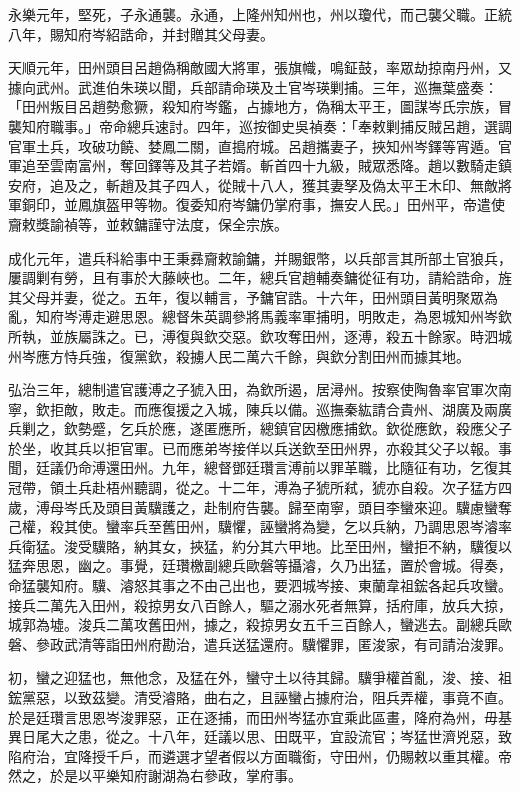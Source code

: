 \begin{pinyinscope}
永樂元年，堅死，子永通襲。永通，上隆州知州也，州以瓊代，而己襲父職。正統八年，賜知府岑紹誥命，并封贈其父母妻。

天順元年，田州頭目呂趙偽稱敵國大將軍，張旗幟，鳴鉦鼓，率眾劫掠南丹州，又據向武州。武進伯朱瑛以聞，兵部請命瑛及土官岑瑛剿捕。三年，巡撫葉盛奏：「田州叛目呂趙勢愈獗，殺知府岑鑑，占據地方，偽稱太平王，圖謀岑氏宗族，冒襲知府職事。」帝命總兵速討。四年，巡按御史吳禎奏：「奉敕剿捕反賊呂趙，選調官軍土兵，攻破功饒、婪鳳二關，直搗府城。呂趙攜妻子，挾知州岑鐸等宵遁。官軍追至雲南富州，奪回鐸等及其子若婿。斬首四十九級，賊眾悉降。趙以數騎走鎮安府，追及之，斬趙及其子四人，從賊十八人，獲其妻孥及偽太平王木印、無敵將軍銅印，並鳳旗盔甲等物。復委知府岑鏞仍掌府事，撫安人民。」田州平，帝遣使齎敕獎諭禎等，並敕鏞謹守法度，保全宗族。

成化元年，遣兵科給事中王秉彞齎敕諭鏞，并賜銀幣，以兵部言其所部土官狼兵，屢調剿有勞，且有事於大藤峽也。二年，總兵官趙輔奏鏞從征有功，請給誥命，旌其父母并妻，從之。五年，復以輔言，予鏞官誥。十六年，田州頭目黃明聚眾為亂，知府岑溥走避思恩。總督朱英調參將馬義率軍捕明，明敗走，為恩城知州岑欽所執，並族屬誅之。已，溥復與欽交惡。欽攻奪田州，逐溥，殺五十餘家。時泗城州岑應方恃兵強，復黨欽，殺擄人民二萬六千餘，與欽分割田州而據其地。

弘治三年，總制遣官護溥之子猇入田，為欽所遏，居潯州。按察使陶魯率官軍次南寧，欽拒敵，敗走。而應復援之入城，陳兵以備。巡撫秦紘請合貴州、湖廣及兩廣兵剿之，欽勢蹙，乞兵於應，遂匿應所，總鎮官因檄應捕欽。欽從應飲，殺應父子於坐，收其兵以拒官軍。已而應弟岑接佯以兵送欽至田州界，亦殺其父子以報。事聞，廷議仍命溥還田州。九年，總督鄧廷瓚言溥前以罪革職，比隨征有功，乞復其冠帶，領土兵赴梧州聽調，從之。十二年，溥為子猇所弒，猇亦自殺。次子猛方四歲，溥母岑氏及頭目黃驥護之，赴制府告襲。歸至南寧，頭目李蠻來迎。驥慮蠻奪己權，殺其使。蠻率兵至舊田州，驥懼，誣蠻將為變，乞以兵納，乃調思恩岑濬率兵衛猛。浚受驥賂，納其女，挾猛，約分其六甲地。比至田州，蠻拒不納，驥復以猛奔思恩，幽之。事覺，廷瓚檄副總兵歐磐等攝濬，久乃出猛，置於會城。得奏，命猛襲知府。驥、濬怒其事之不由己出也，要泗城岑接、東蘭韋祖鋐各起兵攻蠻。接兵二萬先入田州，殺掠男女八百餘人，驅之溺水死者無算，括府庫，放兵大掠，城郭為墟。浚兵二萬攻舊田州，據之，殺掠男女五千三百餘人，蠻逃去。副總兵歐磐、參政武清等詣田州府勘治，遣兵送猛還府。驥懼罪，匿浚家，有司請治浚罪。

初，蠻之迎猛也，無他念，及猛在外，蠻守土以待其歸。驥爭權首亂，浚、接、祖鋐黨惡，以致茲變。清受濬賂，曲右之，且誣蠻占據府治，阻兵弄權，事竟不直。於是廷瓚言思恩岑浚罪惡，正在逐捕，而田州岑猛亦宜乘此區畫，降府為州，毋基異日尾大之患，從之。十八年，廷議以思、田既平，宜設流官；岑猛世濟兇惡，致陷府治，宜降授千戶，而遴選才望者假以方面職銜，守田州，仍賜敕以重其權。帝然之，於是以平樂知府謝湖為右參政，掌府事。


\end{pinyinscope}
